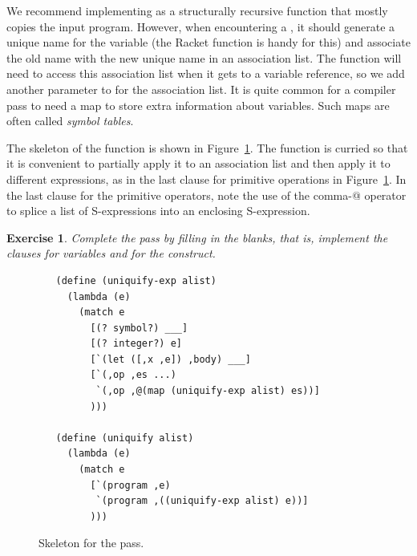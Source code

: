 \documentclass[11pt]{book}
\newtheorem{exercise}[theorem]{Exercise}
\begin{document}
We recommend implementing  as a structurally recursive
function that mostly copies the input program. However, when
encountering a , it should generate a unique name for the
variable (the Racket function  is handy for this) and
associate the old name with the new unique name in an association
list. The  function will need to access this
association list when it gets to a variable reference, so we add
another parameter to  for the association list. It is
quite common for a compiler pass to need a map to store extra
information about variables. Such maps are often called \emph{symbol
  tables}.

The skeleton of the  function is shown in
Figure~\ref{fig:uniquify-s0}.  The function is curried so that it is
convenient to partially apply it to an association list and then apply
it to different expressions, as in the last clause for primitive
operations in Figure~\ref{fig:uniquify-s0}. In the last 
clause for the primitive operators, note the use of the comma-@
operator to splice a list of S-expressions into an enclosing
S-expression.

\begin{exercise}
\normalfont %

Complete the  pass by filling in the blanks, that is,
implement the clauses for variables and for the  construct.
\end{exercise}

\begin{figure}[tbp]
\begin{lstlisting}
   (define (uniquify-exp alist)
     (lambda (e)
       (match e
         [(? symbol?) ___]
         [(? integer?) e]
         [`(let ([,x ,e]) ,body) ___]
         [`(,op ,es ...)
          `(,op ,@(map (uniquify-exp alist) es))]
         )))

   (define (uniquify alist)
     (lambda (e)
       (match e
         [`(program ,e)
          `(program ,((uniquify-exp alist) e))]
         )))
\end{lstlisting}
\caption{Skeleton for the  pass.}
\label{fig:uniquify-s0}
\end{figure}
\end{document}
